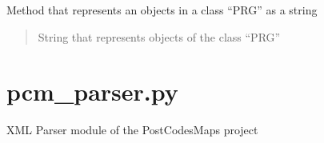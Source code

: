 \documentclass[letterpaper,10pt,english]{sphinxmanual}
\begin{document}
\begin{fulllineitems}
\begin{fulllineitems}
\end{fulllineitems}


\begin{fulllineitems}
\label{\detokenize{pcm_db:pcm_db.PRG.__repr__}}
\pysigstartsignatures
{}
\pysigstopsignatures
\sphinxAtStartPar
Method that represents an objects in a class “PRG” as a string
\begin{quote}\begin{description}
\sphinxAtStartPar
{}

\sphinxAtStartPar
String that represents objects of the class “PRG”

\end{description}\end{quote}

\end{fulllineitems}


\end{fulllineitems}


\sphinxstepscope


\chapter{pcm\_parser.py}
\label{\detokenize{pcm_parser:module-pcm_parser}}\label{\detokenize{pcm_parser:pcm-parser-py}}\label{\detokenize{pcm_parser::doc}}
\sphinxAtStartPar
XML Parser module of the PostCodesMaps project
\end{document}
